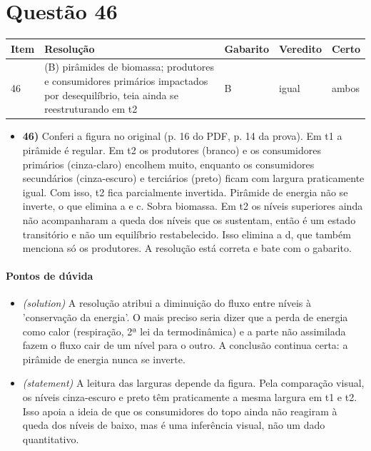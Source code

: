 \documentclass{article}%
\begin{document}
\section*{Questão 46}%
\begin{longtable}{@{}p{} p{} p{} p{} p{}@{}}\toprule Item & Resolução & Gabarito & Veredito & Certo \\ \midrule
46 & (B) pirâmides de biomassa; produtores e consumidores primários impactados por desequilíbrio, teia ainda se reestruturando em t2 & B & igual & ambos \\
\bottomrule\end{longtable}%
\begin{itemize}%
\item%
\textbf{46)} Conferi a figura no original (p. 16 do PDF, p. 14 da prova). Em t1 a pirâmide é regular. Em t2 os produtores (branco) e os consumidores primários (cinza{-}claro) encolhem muito, enquanto os consumidores secundários (cinza{-}escuro) e terciários (preto) ficam com largura praticamente igual. Com isso, t2 fica parcialmente invertida. Pirâmide de energia não se inverte, o que elimina a e c. Sobra biomassa. Em t2 os níveis superiores ainda não acompanharam a queda dos níveis que os sustentam, então é um estado transitório e não um equilíbrio restabelecido. Isso elimina a d, que também menciona só os produtores. A resolução está correta e bate com o gabarito.%
\end{itemize}%
\paragraph{Pontos de dúvida}%
\begin{itemize}%
\item%
\textit{(solution)} A resolução atribui a diminuição do fluxo entre níveis à 'conservação da energia'. O mais preciso seria dizer que a perda de energia como calor (respiração, 2ª lei da termodinâmica) e a parte não assimilada fazem o fluxo cair de um nível para o outro. A conclusão continua certa: a pirâmide de energia nunca se inverte.%
\item%
\textit{(statement)} A leitura das larguras depende da figura. Pela comparação visual, os níveis cinza{-}escuro e preto têm praticamente a mesma largura em t1 e t2. Isso apoia a ideia de que os consumidores do topo ainda não reagiram à queda dos níveis de baixo, mas é uma inferência visual, não um dado quantitativo.%
\end{itemize}%
\end{document}

